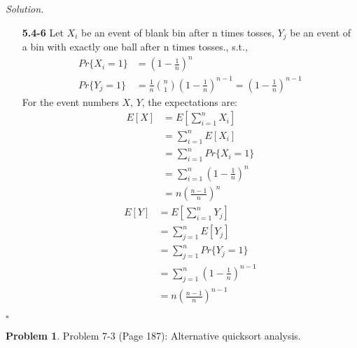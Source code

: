 \documentclass[11pt]{article}
\theoremstyle{definition}
\newtheorem{problem}{Problem}
\newenvironment{solution}{\noindent\emph{Solution.}}{\hfill$\square$}
\begin{document}
\begin{solution}
\begin{enumerate}
   \item[\textbf{5.4-6}]
Let $X_i$ be an event of blank bin after n times tosses, $Y_j$ be an event of a bin with exactly one ball after n times tosses., s.t.,
\begin{align*}
Pr \{ X_i = 1  \} &= \left(  1- \frac{1}{n}   \right) ^n \\
Pr \{ Y_j = 1  \} &= \frac{1}{n} { n \choose 1   } \left(  1- \frac{1}{n}   \right) ^{n-1} =\left(  1- \frac{1}{n}   \right) ^{n-1}
\end{align*}
For the event numbers $X$, $Y$, the expectations are:
\begin{align*}
E \left[  X \right] &= E \left[ \sum_{i=1}^n X_i \right] \\
&=  \sum_{i=1}^n E \left[ X_i \right] \\
&= \sum_{i=1}^n  Pr \{  X_i = 1   \} \\
&= \sum_{i=1}^n \left(  1- \frac{1}{n}   \right) ^n \\
&= n \left(  \frac{n-1}{n}   \right) ^n
\end{align*}
\begin{align*}
E \left[  Y \right] &= E \left[ \sum_{i=1}^n Y_j \right] \\
&=  \sum_{j=1}^n E \left[ Y_j \right] \\
&= \sum_{j=1}^n  Pr \{  Y_j = 1   \} \\
&= \sum_{j=1}^n \left(  1- \frac{1}{n}   \right) ^{n-1} \\
&= n \left(  \frac{n-1}{n}   \right) ^{n-1}
\end{align*}

    
    
  \end{enumerate}
\end{solution}

\newpage



\begin{problem}
Problem 7-3 (Page 187): Alternative quicksort analysis.
\end{problem}
\end{document}
